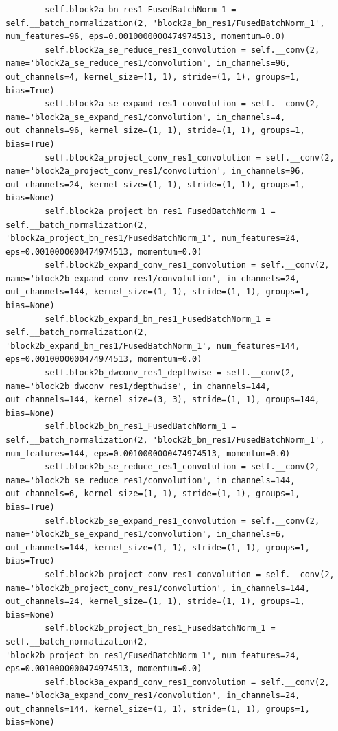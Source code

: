 \documentclass{fisatprojectfinal}
\begin{document}
\begin{appendices}
\begin{lstlisting}
        self.block2a_bn_res1_FusedBatchNorm_1 = self.__batch_normalization(2, 'block2a_bn_res1/FusedBatchNorm_1', num_features=96, eps=0.0010000000474974513, momentum=0.0)
        self.block2a_se_reduce_res1_convolution = self.__conv(2, name='block2a_se_reduce_res1/convolution', in_channels=96, out_channels=4, kernel_size=(1, 1), stride=(1, 1), groups=1, bias=True)
        self.block2a_se_expand_res1_convolution = self.__conv(2, name='block2a_se_expand_res1/convolution', in_channels=4, out_channels=96, kernel_size=(1, 1), stride=(1, 1), groups=1, bias=True)
        self.block2a_project_conv_res1_convolution = self.__conv(2, name='block2a_project_conv_res1/convolution', in_channels=96, out_channels=24, kernel_size=(1, 1), stride=(1, 1), groups=1, bias=None)
        self.block2a_project_bn_res1_FusedBatchNorm_1 = self.__batch_normalization(2, 'block2a_project_bn_res1/FusedBatchNorm_1', num_features=24, eps=0.0010000000474974513, momentum=0.0)
        self.block2b_expand_conv_res1_convolution = self.__conv(2, name='block2b_expand_conv_res1/convolution', in_channels=24, out_channels=144, kernel_size=(1, 1), stride=(1, 1), groups=1, bias=None)
        self.block2b_expand_bn_res1_FusedBatchNorm_1 = self.__batch_normalization(2, 'block2b_expand_bn_res1/FusedBatchNorm_1', num_features=144, eps=0.0010000000474974513, momentum=0.0)
        self.block2b_dwconv_res1_depthwise = self.__conv(2, name='block2b_dwconv_res1/depthwise', in_channels=144, out_channels=144, kernel_size=(3, 3), stride=(1, 1), groups=144, bias=None)
        self.block2b_bn_res1_FusedBatchNorm_1 = self.__batch_normalization(2, 'block2b_bn_res1/FusedBatchNorm_1', num_features=144, eps=0.0010000000474974513, momentum=0.0)
        self.block2b_se_reduce_res1_convolution = self.__conv(2, name='block2b_se_reduce_res1/convolution', in_channels=144, out_channels=6, kernel_size=(1, 1), stride=(1, 1), groups=1, bias=True)
        self.block2b_se_expand_res1_convolution = self.__conv(2, name='block2b_se_expand_res1/convolution', in_channels=6, out_channels=144, kernel_size=(1, 1), stride=(1, 1), groups=1, bias=True)
        self.block2b_project_conv_res1_convolution = self.__conv(2, name='block2b_project_conv_res1/convolution', in_channels=144, out_channels=24, kernel_size=(1, 1), stride=(1, 1), groups=1, bias=None)
        self.block2b_project_bn_res1_FusedBatchNorm_1 = self.__batch_normalization(2, 'block2b_project_bn_res1/FusedBatchNorm_1', num_features=24, eps=0.0010000000474974513, momentum=0.0)
        self.block3a_expand_conv_res1_convolution = self.__conv(2, name='block3a_expand_conv_res1/convolution', in_channels=24, out_channels=144, kernel_size=(1, 1), stride=(1, 1), groups=1, bias=None)

\end{lstlisting}
\end{appendices}
\end{document}
